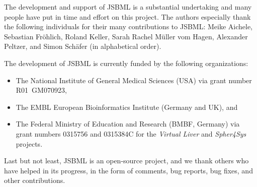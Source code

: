 The development and support of JSBML is a substantial undertaking and many
people have put in time and effort on this project.  The authors especially
thank the following individuals for their many contributions to JSBML:
Meike Aichele, Sebastian Fr\"ohlich, Roland Keller, Sarah Rachel M\"uller
vom Hagen, Alexander Peltzer, and Simon Sch\"afer (in alphabetical order).

The development of JSBML is currently funded by the following
organizations:

\begin{itemize}

\item The National Institute of General Medical Sciences (USA) via grant
number R01~GM070923, 

\item The EMBL European Bioinformatics Institute (Germany and UK), and

\item The Federal Ministry of Education and Research (BMBF, Germany) via
grant numbers 0315756 and 0315384C for the \emph{Virtual Liver} and
\emph{Spher4Sys} projects.

\end{itemize}

Last but not least, JSBML is an open-source project, and we thank others
who have helped in its progress, in the form of comments, bug reports, bug
fixes, and other contributions.
